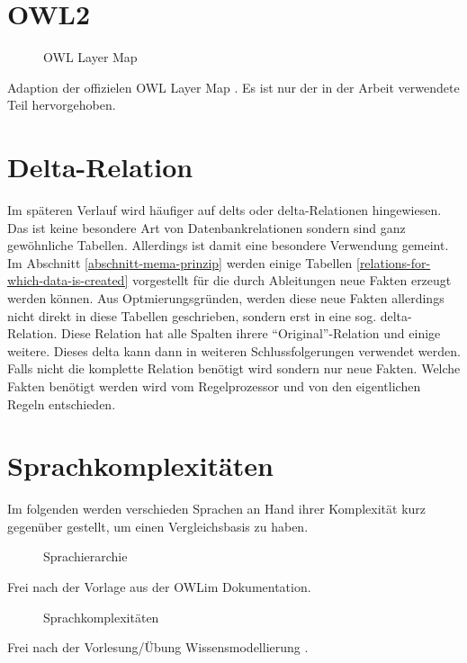 \section{OWL2}
\label{abschnitt-owl2}

\begin{figure}
	\caption{OWL Layer Map}
	\label{image-owl-layer-map}
\end{figure}
Adaption der offizielen OWL Layer Map \cite{OWLLayerMap}. Es ist nur der in der Arbeit verwendete Teil hervorgehoben.

\section{Delta-Relation}
Im späteren Verlauf wird häufiger auf delts oder delta-Relationen hingewiesen. Das ist keine besondere Art von Datenbankrelationen sondern sind ganz gewöhnliche Tabellen. Allerdings ist damit eine besondere Verwendung gemeint. Im Abschnitt \ref{abschnitt-mema-prinzip} werden einige Tabellen \ref{relations-for-which-data-is-created} vorgestellt für die durch Ableitungen neue Fakten erzeugt werden können. Aus Optmierungsgründen, werden diese neue Fakten allerdings nicht direkt in diese Tabellen geschrieben, sondern erst in eine sog. delta-Relation. Diese Relation hat alle Spalten ihrere ``Original''-Relation und einige weitere. Dieses delta kann dann in weiteren Schlussfolgerungen verwendet werden. Falls nicht die komplette Relation benötigt wird sondern nur neue Fakten. Welche Fakten benötigt werden wird vom Regelprozessor und von den eigentlichen Regeln entschieden.

\section{Sprachkomplexitäten}
Im folgenden werden verschieden Sprachen an Hand ihrer Komplexität kurz gegenüber gestellt, um einen Vergleichsbasis zu haben.


\begin{figure}
	\caption{Sprachierarchie \cite{OWLimManual}}
	\label{image-sprachhierarchie}
\end{figure}
Frei nach der Vorlage aus der OWLim Dokumentation.

\begin{figure}
	\caption{Sprachkomplexitäten}
	\label{image-sprachhierarchie}
\end{figure}
Frei nach der Vorlesung/Übung Wissensmodellierung \cite{vonHenke2009}.


